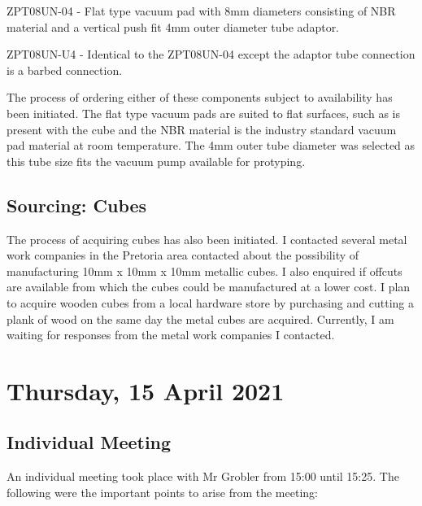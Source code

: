 \begin{compactitem}
    \item ZPT08UN-04 - Flat type vacuum pad with 8mm diameters consisting of \ac{NBR} material and a vertical push fit 4mm outer diameter tube adaptor.
    \item ZPT08UN-U4 - Identical to the ZPT08UN-04 except the adaptor tube connection is a barbed connection.
\end{compactitem}

The process of ordering either of these components subject to availability has been initiated. The flat type vacuum pads are suited to flat surfaces, such as is present with the cube and the \ac{NBR} material is the industry standard vacuum pad material at room temperature. The 4mm outer tube diameter was selected as this tube size fits the vacuum pump available for protyping.

\subsection{Sourcing: Cubes}

The process of acquiring cubes has also been initiated. I contacted several metal work companies in the Pretoria area contacted about the possibility of manufacturing 10mm x 10mm x 10mm metallic cubes. I also enquired if offcuts are available from which the cubes could be manufactured at a lower cost. I plan to acquire wooden cubes from a local hardware store by purchasing and cutting a plank of wood on the same day the metal cubes are acquired. Currently, I am waiting for responses from the metal work companies I contacted.

\pendsign

\section[2021/04/15]{Thursday, 15 April 2021}

\subsection{Individual Meeting}

An individual meeting took place with Mr Grobler from 15:00 until 15:25. The following were the important points to arise from the meeting:

